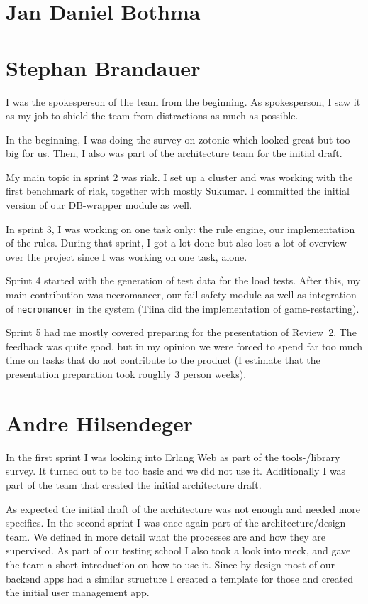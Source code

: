 \documentclass[11pt,a4paper]{report}
\begin{document}
\section{Jan Daniel Bothma}
\section{Stephan Brandauer}
I was the spokesperson of the team from the beginning. As spokesperson,
I saw it as my job to shield the team from distractions as much as possible.

In the beginning, I was doing the survey on zotonic which looked great but too
big for us. Then, I also was part of the architecture team for the initial
draft.

My main topic in sprint 2 was riak. I set up a cluster and was working with the
first benchmark of riak, together with mostly Sukumar.
I committed the initial version of our DB-wrapper module as well.

In sprint 3, I was working on one task only: the rule engine, our implementation
of the rules. During that sprint, I got a lot done but also lost a lot of
overview over the project since I was working on one task, alone.

Sprint 4 started with the generation of test data for the load tests. After
this, my main contribution was necromancer, our fail-safety module as well as
integration of {\tt necromancer} in the system (Tiina did the implementation
of game-restarting).

Sprint 5 had me mostly covered preparing for the presentation of Review~2.
The feedback was quite good, but in my opinion we were forced to spend far too
much time on tasks that do not contribute to the product (I estimate that the
presentation preparation took roughly 3 person weeks).

\section{Andre Hilsendeger}
In the first sprint I was looking into Erlang Web as part of the tools-/library survey.
It turned out to be too basic and we did not use it.
Additionally I was part of the team that created the initial architecture draft.

As expected the initial draft of the architecture was not enough and needed more specifics.
In the second sprint I was once again part of the architecture/design team.
We defined in more detail what the processes are and how they are supervised.
As part of our testing school I also took a look into meck, and gave the team a short introduction
on how to use it.
Since by design most of our backend apps had a similar structure I created a template for those
and created the initial user management app.
\end{document}
